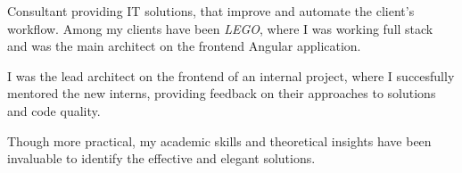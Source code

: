 Consultant providing IT solutions, that improve and automate the client's
workflow. Among my clients have been \emph{LEGO}, where I was working full stack
and was the main architect on the frontend Angular application.

\medskip

I was the lead architect on the frontend of an internal project, where I
succesfully mentored the new interns, providing feedback on their approaches to
solutions and code quality.

\medskip

Though more practical, my academic skills and theoretical insights have been
invaluable to identify the effective and elegant solutions.

